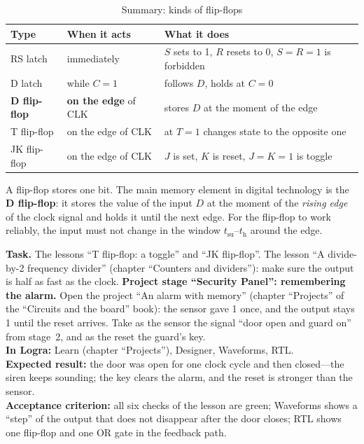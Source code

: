 \begin{table}[H]
\centering
\caption{Summary: kinds of flip-flops}
\small
\begin{tabularx}{\textwidth}{l l X}
\toprule
\textbf{Type} & \textbf{When it acts} & \textbf{What it does} \\
\midrule
RS latch & immediately & $S$ sets to 1, $R$ resets to 0, $S=R=1$ is forbidden \\
D latch  & while $C = 1$ & follows $D$, holds at $C = 0$ \\
\textbf{D flip-flop} & \textbf{on the edge} of CLK & stores $D$ at the moment of the edge \\
T flip-flop  & on the edge of CLK & at $T=1$ changes state to the opposite one \\
JK flip-flop & on the edge of CLK & $J$ is set, $K$ is reset, $J=K=1$ is toggle \\
\bottomrule
\end{tabularx}
\end{table}

\begin{ideabox}
A flip-flop stores one bit. The main memory element in digital technology is the
\textbf{D flip-flop}: it stores the value of the input $D$ at the moment of the
\emph{rising edge} of the clock signal and holds it until the next edge. For the
flip-flop to work reliably, the input must not change in the window
$t_\text{su}$--$t_\text{h}$ around the edge.
\end{ideabox}

\begin{diybox}
\textbf{Task.}  The lessons ``T flip-flop: a toggle'' and ``JK flip-flop''.
 The lesson ``A divide-by-2 frequency divider'' (chapter ``Counters and
dividers''): make sure the output is half as fast as the clock. 
\textbf{Project stage ``Security Panel'': remembering the alarm.} Open the
project ``An alarm with memory'' (chapter ``Projects'' of the ``Circuits and the
board'' book): the sensor  gave 1 once, and the output 
stays 1 until the reset  arrives. Take as the sensor the signal
``door open and guard on'' from stage~2, and as the reset the guard's key.\\
\textbf{In Logra:} Learn (chapter ``Projects''), Designer, Waveforms, RTL.\\
\textbf{Expected result:} the door was open for one clock cycle and then closed---the
siren keeps sounding; the key clears the alarm, and the reset is stronger than the
sensor.\\
\textbf{Acceptance criterion:} all six checks of the lesson are green; Waveforms
shows a ``step'' of the output that does not disappear after the door closes; RTL
shows one flip-flop and one OR gate in the feedback path.
\end{diybox}

